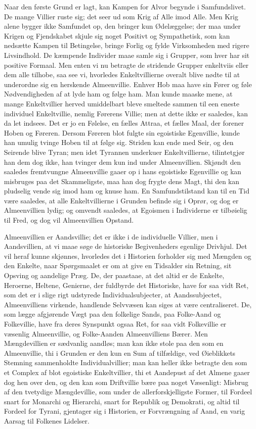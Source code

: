 \documentclass[12pt]{book}
\newcommand{\apage}[1]{\marginnote{\footnotesize\textit{[#1]}}}
\begin{document}
Naar den første Grund er lagt, kan Kampen for Alvor begynde i Samfundslivet.
De mange Villier ruste sig; det seer ud som Krig af Alle imod Alle. Men Krig
alene bygger ikke Samfundet op, den bringer kun Ødelæggelse; der maa under
Krigen og Fjendskabet skjule sig noget Positivt og Sympathetisk, som kan
nedsætte Kampen til Betingelse, bringe Forlig og fylde Virksomheden med
rigere Livsindhold. De kæmpende Individer maae samle sig i Grupper, som hver
har sit positive Formaal. Men enten vi nu betragte de stridende Grupper
enkeltviis eller dem alle tilhobe, saa see vi, hvorledes Enkeltvillierne
overalt blive nødte til at underordne sig en herskende Almeenvillie. Enhver
Hob maa have sin Fører og føle Nødvendigheden af at lyde ham og følge ham.
Man kunde maaske mene, at mange Enkeltvillier herved umiddelbart bleve
smeltede sammen til een eneste individuel Enkeltvillie, nemlig Førerens
Villie; men at dette ikke er saaledes, kan da let indsees. Det er jo en
Følelse, en fælles Attraa, et fælles Maal, der forener Hoben og Føreren.
Dersom Føreren blot fulgte sin egoistiske Egenvillie, kunde han umulig tvinge
Hoben til at følge sig. Striden kan ende med Seir, og den Seirende blive
Tyran; men idet Tyrannen underkuer Enkeltvillierne, tilintetgjør han dem dog
ikke, han tvinger dem kun ind under Almeenvillien. Skjøndt den saaledes
fremtvungne Almeenvillie gaaer op i hans egoistiske Egenvillie og kan
misbruges paa det Skammeligste, maa \apage{237} han dog frygte dens Magt, thi den kan
pludselig vende sig imod ham og knuse ham. En Samfundstilstand kan til en Tid
være saaledes, at alle Enkeltvillierne i Grunden befinde sig i Oprør, og dog
er Almeenvillien lydig; og omvendt saaledes, at Egoismen i Individerne er
tilbøielig til Fred, og dog vil Almeenvillien Opstand.

Almeenvillien er Aandsvillie; det er ikke i de individuelle Villier, men i
Aandsvillien, at vi maae søge de historiske Begivenheders egenlige
Drivhjul. Det vil heraf kunne skjønnes, hvorledes det i Historien forholder
sig med Mængden og den Enkelte, naar Spørgsmaalet er om at give en Tidsalder
sin Retning, sit Opsving og aandelige Præg. De, der paastaae, at det altid
er de Enkelte, Heroerne, Heltene, Genierne, der fuldbyrde det Historiske,
have for saa vidt Ret, som det er i slige rigt udstyrede Individualsubjecter,
at Aandssubjectet, Almeenvilliens virkende, handlende Selvvæsen kan siges at
være centraliseret. De, som lægge afgjørende Vægt paa den folkelige Sands,
paa Folke-Aand og Folkevillie, have fra deres Synspunkt ogsaa Ret, for saa
vidt Folkevillie er væsenlig Almeenvillie, og Folke-Aanden Almeenvilliens
Bærer. Men Mængdevillien er sædvanlig aandløs; man kan ikke stole paa den
som en Almeenvillie, thi i Grunden er den kun en Sum af tilfældige, ved
Øieblikkets Stemning sammenholdte Individualvillier; man kan heller ikke
betragte den som et Complex af blot egoistiske Enkeltvillier, thi et
Aandepust af det Almene gaaer dog hen over den, og den kan som Driftvillie
bære paa noget Væsenligt: Misbrug af den tvetydige Mængdevillie, \apage{238} som under
de allerforskjelligste Former, til Fordeel snart for Monarchi og Hierarchi,
snart for Republik og Demokrati, og altid til Fordeel for Tyrani, gjentager
sig i Historien, er Forvrængning af Aand, en varig Aarsag til Folkenes
Lidelser.
\end{document}
